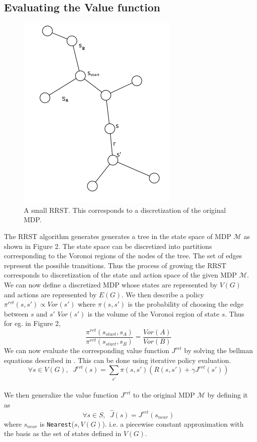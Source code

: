 \documentclass[wcp]{jmlr}
\begin{document}
\subsection*{Evaluating the Value function}
\begin{figure}[htb]
\centering
\label{fig:rrst}
\includegraphics[scale=0.4]{rrst.png}
\caption{A small RRST. This corresponds to a discretization of the original MDP.}
\end{figure}

The RRST algorithm generates generates a tree in the state space of MDP $\mathcal{M}$ as shown in Figure 2. The state space can be discretized into partitions corresponding to the Voronoi regions of the nodes of the tree. The set of edges represent the possible transitions. Thus the process of growing the RRST corresponds to discretization of the state and action space of the given MDP $\mathcal{M}$. We can now define a discretized MDP whose states are represented by $V(G)$ and actions are represented by $E(G)$. We then describe a policy $\pi^{rrt}(s,s') \varpropto Vor(s')$ where $\pi(s,s')$ is the probability of choosing the edge between $s$ and $s'$ $Vor(s')$ is the volume of the Voronoi region of state $s$. Thus for eg. in Figure 2,
\begin{equation*}
\frac{\pi^{rrt}(s_{start},s_A)}{\pi^{rrt}(s_{start},s_B)} = \frac{Vor(A)}{Vor(B)}
\end{equation*}
We can now evaluate the corresponding value function $J^{rrt}$ by solving the bellman equations described in .
This can be done using iterative policy evaluation.
\begin{equation}
\label{eq:poleval}
\forall s \in V(G),\;\; J^{rrt}(s) = \sum_{s'}\pi(s,s')( R(s,s') + \gamma J^{rrt}(s'))
\end{equation}\\
We then generalize the value function $J^{rrt}$ to the original MDP $\mathcal{M}$ by defining it as 
\begin{equation*}
\forall s \in S,\;\; \hat{J}(s) = J^{rrt}(s_{near})
\end{equation*}
where $s_{near}$ is \texttt{Nearest}($s,V(G)$). i.e. a piecewise constant approximation with the basis as the set of states defined in $V(G)$.
\end{document}
